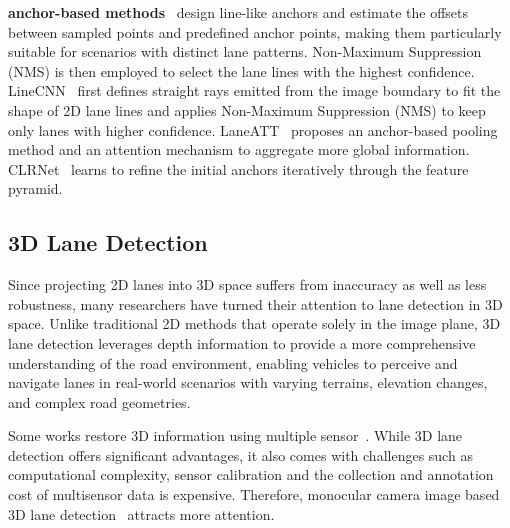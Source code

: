 \textbf{anchor-based methods}~\cite{li2019line, liu2021condlanenet, tabelini2021keep, zheng2022clrnet, ran2023flamnet, huang2023anchor3dlane} design line-like anchors and estimate the offsets between sampled points and predefined anchor points, making them particularly suitable for scenarios with distinct lane patterns.
Non-Maximum Suppression (NMS) is then employed to select the lane lines with the highest confidence.
LineCNN~\cite{li2019line} first defines straight rays emitted from the image boundary to fit the shape of 2D lane lines and applies Non-Maximum Suppression (NMS) to keep only lanes with higher confidence.
LaneATT~\cite{tabelini2021keep} proposes an anchor-based pooling method and an attention mechanism to aggregate more global information.
CLRNet~\cite{zheng2022clrnet} learns to refine the initial anchors iteratively through the feature pyramid.

\subsection{3D Lane Detection}
\label{subsec:3d}
Since projecting 2D lanes into 3D space suffers from inaccuracy as well as less robustness, many researchers have turned their attention to lane detection in 3D space.
Unlike traditional 2D methods that operate solely in the image plane, 3D lane detection leverages depth information to provide a more comprehensive understanding of the road environment,
enabling vehicles to perceive and navigate lanes in real-world scenarios with varying terrains, elevation changes, and complex road geometries.

Some works restore 3D information using multiple sensor~\cite{cordts2016cityscapes, luo2022m, chen2022persformer}.
While 3D lane detection offers significant advantages, it also comes with challenges such as computational complexity,
sensor calibration and the collection and annotation cost of multisensor data is expensive.
Therefore, monocular camera image based 3D lane detection~\cite{efrat20203d, garnett20193d, guo2020gen, liu2022learning, yan2022once, huang2023anchor3dlane, wang2023bev} attracts more attention.

